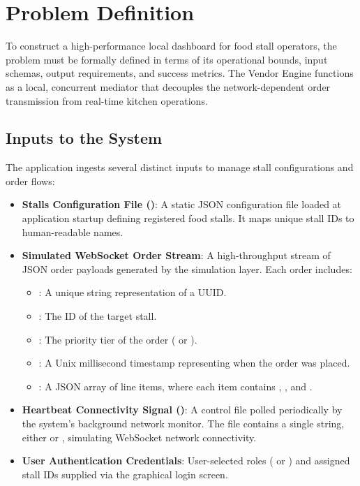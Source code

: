 
\section{Problem Definition}
\label{sec:problem_definition}

To construct a high-performance local dashboard for food stall operators, the problem must be formally defined in terms of its operational bounds, input schemas, output requirements, and success metrics. The Vendor Engine functions as a local, concurrent mediator that decouples the network-dependent order transmission from real-time kitchen operations.

\subsection{Inputs to the System}
The application ingests several distinct inputs to manage stall configurations and order flows:
\begin{itemize}
    \item \textbf{Stalls Configuration File ()}: A static JSON configuration file loaded at application startup defining registered food stalls. It maps unique stall IDs to human-readable names.
    \item \textbf{Simulated WebSocket Order Stream}: A high-throughput stream of JSON order payloads generated by the simulation layer. Each order includes:
    \begin{itemize}
        \item {}: A unique string representation of a UUID.
        \item {}: The ID of the target stall.
        \item {}: The priority tier of the order ( or ).
        \item {}: A Unix millisecond timestamp representing when the order was placed.
        \item {}: A JSON array of line items, where each item contains , , and .
    \end{itemize}
    \item \textbf{Heartbeat Connectivity Signal ()}: A control file polled periodically by the system's background network monitor. The file contains a single string, either  or , simulating WebSocket network connectivity.
    \item \textbf{User Authentication Credentials}: User-selected roles (\allowbreak{} or \allowbreak{}) and assigned stall IDs supplied via the graphical login screen.
\end{itemize}

